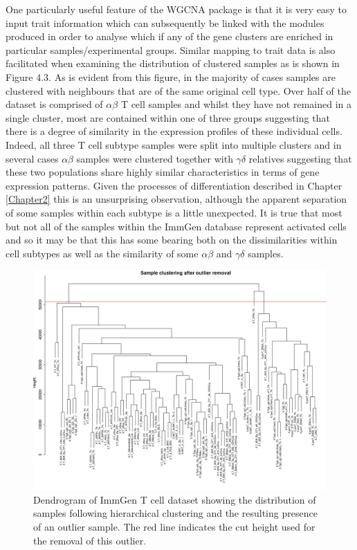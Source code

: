 One particularly useful feature of the WGCNA package is that it is very easy to input trait information which can subsequently be linked with the modules produced in order to analyse which if any of the gene clusters are enriched in particular samples/experimental groups. Similar mapping to trait data is also facilitated when examining the distribution of clustered samples as is shown in Figure 4.3. As is evident from this figure, in the majority of cases samples are clustered with neighbours that are of the same original cell type. Over half of the dataset is comprised of $\alpha\beta$ T cell samples and whilst they have not remained in a single cluster, most are contained within one of three groups suggesting that there is a degree of similarity in the expression profiles of these individual cells. Indeed, all three T cell subtype samples were split into multiple clusters and in several cases $\alpha\beta$ samples were clustered together with $\gamma\delta$ relatives suggesting that these two populations share highly similar characteristics in terms of gene expression patterns. Given the processes of differentiation described in Chapter \ref{Chapter2} this is an unsurprising observation, although the apparent separation of some samples within each subtype is a little unexpected. It is true that most but not all of the samples within the ImmGen database represent activated cells and so it may be that this has some bearing both on the dissimilarities within cell subtypes as well as the similarity of some $\alpha\beta$ and $\gamma\delta$ samples. 

\begin{figure}[H] 
    \centering
\includegraphics[width=1\textwidth]{Figures/Chapter4/WGCNA/tcell_immgen_data_sampleClustering.png}
\caption{\small{Dendrogram of ImmGen T cell dataset showing the distribution of samples following hierarchical clustering and the resulting presence of an outlier sample. The red line indicates the cut height used for the removal of this outlier. } }
    \label{fig:11}
\end{figure}

